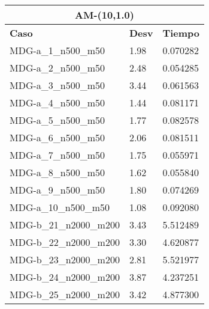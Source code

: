 \documentclass[10pt,a4paper]{article}
\begin{document}
\begin{table}[]
	\centering
	\begin{tabular}{|l|l|l|}
		\hline
		\multicolumn{3}{|c|}{\textbf{AM-(10,1.0)}}                                                                 \\ \hline
		\textbf{Caso}          & \multicolumn{1}{c|}{\textbf{Desv}} & \multicolumn{1}{c|}{\textbf{Tiempo}} \\ \hline
		MDG-a\_1\_n500\_m50    & 1.98                               & 0.070282                             \\ \hline
		MDG-a\_2\_n500\_m50    & 2.48                               & 0.054285                             \\ \hline
		MDG-a\_3\_n500\_m50    & 3.44                               & 0.061563                             \\ \hline
		MDG-a\_4\_n500\_m50    & 1.44                               & 0.081171                             \\ \hline
		MDG-a\_5\_n500\_m50    & 1.77                               & 0.082578                             \\ \hline
		MDG-a\_6\_n500\_m50    & 2.06                               & 0.081511                             \\ \hline
		MDG-a\_7\_n500\_m50    & 1.75                               & 0.055971                             \\ \hline
		MDG-a\_8\_n500\_m50    & 1.62                               & 0.055840                             \\ \hline
		MDG-a\_9\_n500\_m50    & 1.80                               & 0.074269                             \\ \hline
		MDG-a\_10\_n500\_m50   & 1.08                               & 0.092080                             \\ \hline
		MDG-b\_21\_n2000\_m200 & 3.43                               & 5.512489                             \\ \hline
		MDG-b\_22\_n2000\_m200 & 3.30                               & 4.620877                             \\ \hline
		MDG-b\_23\_n2000\_m200 & 2.81                               & 5.521977                             \\ \hline
		MDG-b\_24\_n2000\_m200 & 3.87                               & 4.237251                             \\ \hline
		MDG-b\_25\_n2000\_m200 & 3.42                               & 4.877300                             \\ \hline

\end{tabular}
\end{table}
\end{document}
